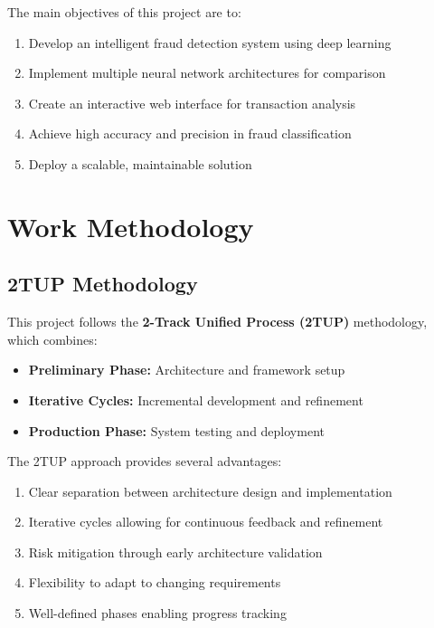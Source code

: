 \documentclass[12pt,a4paper,twoside]{report}
\begin{document}
The main objectives of this project are to:

\begin{enumerate}
    \item Develop an intelligent fraud detection system using deep learning
    \item Implement multiple neural network architectures for comparison
    \item Create an interactive web interface for transaction analysis
    \item Achieve high accuracy and precision in fraud classification
    \item Deploy a scalable, maintainable solution
\end{enumerate}

\section{Work Methodology}

\subsection{2TUP Methodology}

This project follows the \textbf{2-Track Unified Process (2TUP)} methodology, which combines:

\begin{itemize}
    \item \textbf{Preliminary Phase:} Architecture and framework setup
    \item \textbf{Iterative Cycles:} Incremental development and refinement
    \item \textbf{Production Phase:} System testing and deployment
\end{itemize}

The 2TUP approach provides several advantages:

\begin{enumerate}
    \item Clear separation between architecture design and implementation
    \item Iterative cycles allowing for continuous feedback and refinement
    \item Risk mitigation through early architecture validation
    \item Flexibility to adapt to changing requirements
    \item Well-defined phases enabling progress tracking
\end{enumerate}
\end{document}
